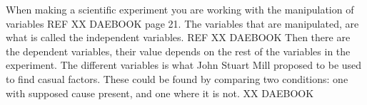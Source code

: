 When making a scientific experiment you are working with the manipulation of variables REF XX DAEBOOK page 21. The variables that are manipulated, are what is called the independent variables. REF XX DAEBOOK 
Then there are the dependent variables, their value depends on the rest of the variables in the experiment. The different variables is what John Stuart Mill proposed to be used to find casual factors. These could be found by comparing two conditions: one with supposed cause present, and one where it is not. XX DAEBOOK